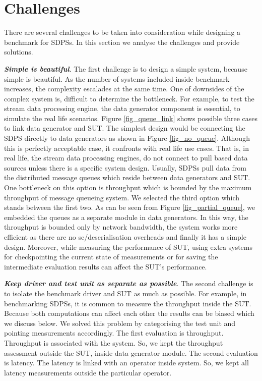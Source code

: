 \section{Challenges}
\label{chal}
There are several challenges to be taken into consideration while designing a benchmark for SDPSs. In this section we analyse the challenges and provide solutions.

\textbf{ \textit{Simple is beautiful}}. The first challenge is to design a simple system, because simple is beautiful. As the number of systems included inside benchmark increases, the complexity escalades at the same time. One of downsides of the complex system is, difficult to determine the bottleneck. For example, to test the stream data processing engine, the data generator component is essential, to simulate the real life scenarios. Figure \ref{fig_queue_link} shows possible three cases to link data generator and SUT. The simplest design would be connecting the SDPS directly to data generators as shown in Figure \ref{fig_no_queue}. Although this is perfectly acceptable case, it confronts with real life use cases. That is,  in real life, the stream data processing engines, do not connect to pull based data sources unless there is a specific system design. Usually, SDPSs pull data from the distributed message queues which reside between data generators and SUT. One bottleneck on this option is throughput which is bounded by the maximum throughput of message queueing system. We selected the third option which stands between the first two. As can be seen from Figure \ref{fig_partial_queue}, we embedded the queues as a separate module in data generators. In this way, the throughput is bounded only by network bandwidth, the system works more efficient as there are no se/deserialisation overheads and finally it has a simple design. Moreover, while measuring the performance of SUT, using extra systems for checkpointing the current state of measurements or for saving the intermediate evaluation results can affect the SUT's performance.


\textbf{ \textit{Keep driver and test unit as separate as possible}}. The second challenge is to isolate the benchmark driver and SUT as much as possible. For example, in benchmarking SDPSs, it is common to measure the throughput inside the SUT. Because both computations can affect each other the results can be  biased  which we discuss below. We solved this problem by categorising the test unit and pointing measurements accordingly. The first evaluation is throughput. Throughput is associated with the system. So, we kept the throughput assessment outside the SUT, inside data generator module. The second evaluation is latency. The latency is linked with an operator inside system. So, we kept all latency measurements outside the particular operator.

